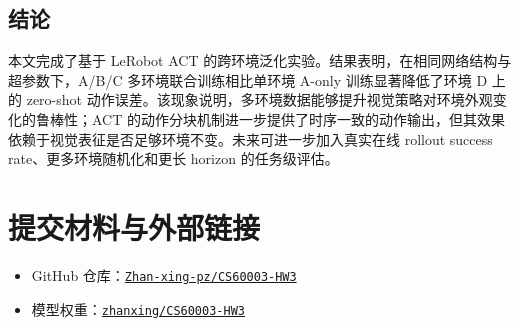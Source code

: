 \documentclass[11pt,UTF8,fontset=fandol]{ctexart}
\begin{document}
\subsection{结论}
本文完成了基于 LeRobot ACT 的跨环境泛化实验。结果表明，在相同网络结构与超参数下，A/B/C 多环境联合训练相比单环境 A-only 训练显著降低了环境 D 上的 zero-shot 动作误差。该现象说明，多环境数据能够提升视觉策略对环境外观变化的鲁棒性；ACT 的动作分块机制进一步提供了时序一致的动作输出，但其效果依赖于视觉表征是否足够环境不变。未来可进一步加入真实在线 rollout success rate、更多环境随机化和更长 horizon 的任务级评估。

\section{提交材料与外部链接}
\begin{itemize}
  \item GitHub 仓库：\href{https://github.com/Zhan-xing-pz/CS60003-HW3}{\texttt{Zhan-xing-pz/CS60003-HW3}}
  \item 模型权重：\href{https://huggingface.co/zhanxing/CS60003-HW3/tree/main}{\texttt{zhanxing/CS60003-HW3}}
\end{itemize}
\end{document}
